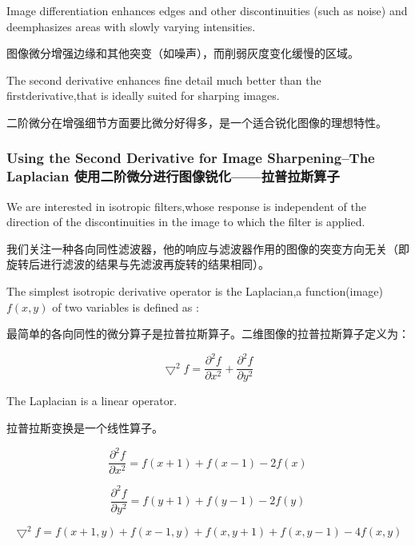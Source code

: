 \documentclass[a4paper,12pt]{article}
\numberwithin{equation}{section}%
\begin{document}
Image differentiation enhances edges and other discontinuities (such as noise) and deemphasizes areas with slowly varying intensities.

图像微分增强边缘和其他突变（如噪声），而削弱灰度变化缓慢的区域。

The second derivative enhances fine detail much better than the firstderivative,that is ideally suited for sharping images.

二阶微分在增强细节方面要比微分好得多，是一个适合锐化图像的理想特性。

\subsubsection{Using the Second Derivative for Image Sharpening--The Laplacian 使用二阶微分进行图像锐化——拉普拉斯算子}

We are interested in isotropic filters,whose response is independent of the direction of the discontinuities in the image to which the filter is applied.

我们关注一种各向同性滤波器，他的响应与滤波器作用的图像的突变方向无关（即旋转后进行滤波的结果与先滤波再旋转的结果相同）。

The  simplest isotropic derivative operator is the Laplacian,a function(image) $f(x,y)$ of two variables is defined as :

最简单的各向同性的微分算子是拉普拉斯算子。二维图像的拉普拉斯算子定义为：

\begin{equation} \label{3.29}
\bigtriangledown^{2}f= \frac{\partial^{2}f}{\partial x^{2}}+\frac{\partial^{2}f}{\partial y^{2}}
\end{equation}

The Laplacian is a linear operator.

拉普拉斯变换是一个线性算子。


\begin{equation} \label{3.30}
 \frac{\partial^{2}f}{\partial x^{2}}=f(x+1)+f(x-1)-2f(x)
\end{equation}

\begin{equation} \label{3.31}
 \frac{\partial^{2}f}{\partial y^{2}}=f(y+1)+f(y-1)-2f(y)
\end{equation}

\begin{equation} \label{3.32}
\bigtriangledown^{2}f= f(x+1,y)+f(x-1,y)+f(x,y+1)+f(x,y-1)-4f(x,y)
\end{equation}
\end{document}
